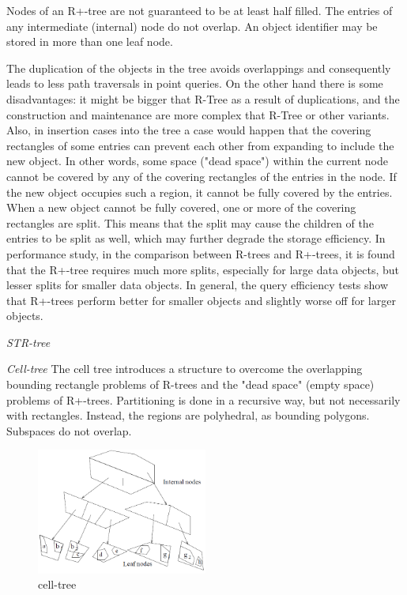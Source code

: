 \documentclass[a4paper,12pt]{article}
\begin{document}
Nodes of an R+-tree are not guaranteed to be at least half filled.
 The entries of any intermediate (internal) node do not overlap.
 An object identifier may be stored in more than one leaf node.

The duplication of the objects in the tree avoids overlappings and consequently leads to less path traversals in point queries. 
On the other hand there is some disadvantages: it might be bigger that R-Tree as a result of duplications, and the construction and maintenance are more complex that R-Tree or other variants. 
Also, in insertion cases into the tree a case would happen that the	covering rectangles of some entries can prevent each other from expanding to include the new object. In other words, some space ("dead space") within the current node cannot be covered by any of the covering rectangles of the entries in the node. If the new object occupies such a region, it cannot be fully covered by the entries. When a new object cannot be fully covered, one or more of the covering rectangles are split. This means that the split may cause the children of the entries to be split as well, which may further degrade the storage efficiency.
In performance study, in the comparison between R-trees and R+-trees, it is found that the R+-tree requires much more splits, especially for large data objects, but lesser splits for smaller data objects. 
In general, the query efficiency tests show that R+-trees perform better for smaller objects and slightly worse off for larger objects.

\emph{STR-tree}

\emph{Cell-tree}
The cell tree introduces a structure to overcome the overlapping bounding rectangle problems of R-trees and the "dead space" (empty space) problems of R+-trees. Partitioning is done in a recursive way, but not necessarily with rectangles. Instead, the regions are polyhedral, as bounding polygons. Subspaces do not overlap.  
\begin{figure}
\centering
\includegraphics[width=0.5\textwidth]{celltree}
\caption{cell-tree}
\label{figcelltree}
\end{figure}
\end{document}
